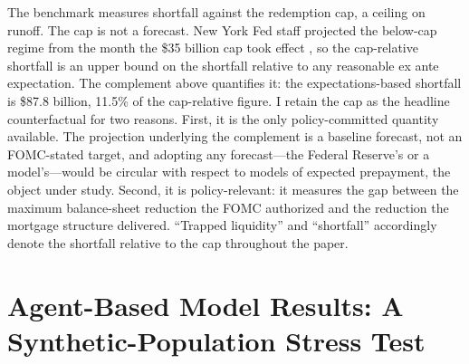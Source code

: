 \documentclass[12pt]{article}
\begin{document}
The benchmark measures shortfall against the redemption cap, a ceiling on runoff. The cap is not a forecast. New York Fed staff projected the below-cap regime from the month the \$35 billion cap took effect \citep{nyfed2022}, so the cap-relative shortfall is an upper bound on the shortfall relative to any reasonable ex ante expectation. The complement above quantifies it: the expectations-based shortfall is \$87.8 billion, 11.5\% of the cap-relative figure. I retain the cap as the headline counterfactual for two reasons. First, it is the only policy-committed quantity available. The projection underlying the complement is a baseline forecast, not an FOMC-stated target, and adopting any forecast---the Federal Reserve's or a model's---would be circular with respect to models of expected prepayment, the object under study. Second, it is policy-relevant: it measures the gap between the maximum balance-sheet reduction the FOMC authorized and the reduction the mortgage structure delivered. ``Trapped liquidity'' and ``shortfall'' accordingly denote the shortfall relative to the cap throughout the paper.
\section{Agent-Based Model Results: A Synthetic-Population Stress Test}\label{sec:abm}
\end{document}
